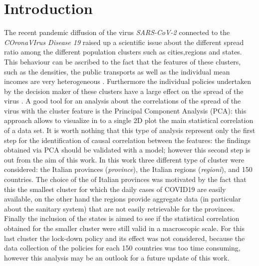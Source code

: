 \documentclass[
12pt, %
a4paper, %
oneside, %
headinclude,footinclude, %
BCOR5mm, %
]{scrartcl}
\begin{document}



\newpage %


\section{Introduction} \label{introduction}
The recent pandemic diffusion of the virus \textit{SARS-CoV-2} connected to the \textit{COronaVIrus Disease 19} raised up a scientific issue about the different spread ratio among the different population clusters such as cities,regions and states. This behaviour can be ascribed to the fact that the features of these clusters, such as the densities, the public transports as well as the individual mean incomes are very heterogeneous \cite{sebhatu2020explaining,skorka2020macroecology}. Furthermore the individual policies undertaken by the decision maker of these clusters have a large effect on the spread of the virus \cite{block2020social}. A good tool for an analysis about the correlations of the spread of the virus with the cluster feature is the Principal Component Analysis (PCA): this approach allows to visualize in to a single 2D plot the main statistical correlation of a data set. It is worth nothing that this type of analysis represent only the first step for the identification of causal correlation between the features: the findings obtained via PCA should be validated with a model; however this second step is out from the aim of this work. In this work three different type of cluster were considered: the Italian provinces (\textit{province}), the Italian regions (\textit{regioni}), and 150 countries. The choice of the of Italian provinces was motivated by the fact that this the smallest cluster for which the daily cases of COVID19 are easily available, on the other hand the regions provide aggregate data (in particular about the sanitary system) that are not easily retrievable for the provinces. Finally the inclusion of the states is aimed to see if the statistical correlation obtained for the smaller cluster were still valid in a macroscopic scale. For this last cluster the lock-down policy and its effect was not considered, because the data collection of the policies for each 150 countries was too time consuming, however this analysis may be an outlook for a future update of this work. 
\end{document}

